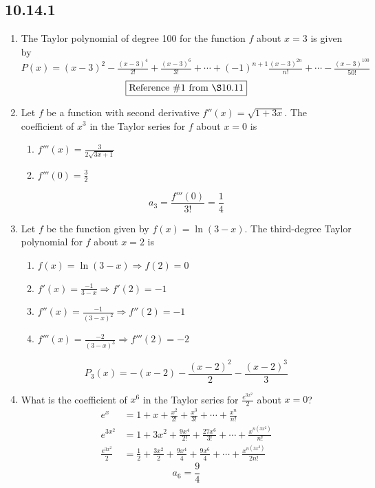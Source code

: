 \documentclass[12pt]{article}
\begin{document}
\subsection*{10.14.1}
\begin{enumerate}
	\item The Taylor polynomial of degree 100 for the function $f$ about $x = 3$ is given by $P(x) = (x-3)^2 - \frac{(x-3)^4}{2!} + \frac{(x-3)^6}{3!} + \cdots + (-1)^{n+1} \frac{(x-3)^{2n}}{n!}+ \cdots - \frac{(x-3)^{100}}{50!}$
	      $$\boxed{\text{Reference } \# 1 \text{ from } \S 10.11}$$
	\item Let $f$ be a function with second derivative $f''(x) = \sqrt{1+3x}$. The coefficient of $x^3$ in the Taylor series for $f$ about $x = 0$ is
	      \begin{enumerate}
	      	\item $f'''(x) = \frac{3}{2\sqrt{3x+1}}$
	      	\item $f'''(0) = \frac{3}{2}$
	      \end{enumerate}
	      $$a_3 = \frac{f'''(0)}{3!} = \boxed{\frac{1}{4}}$$
	\item Let $f$ be the function given by $f(x)=\ln(3-x)$. The third-degree Taylor polynomial for $f$ about $x=2$ is
	      \begin{enumerate}
	      	\item $f(x) = \ln(3-x) \Longrightarrow f(2) = 0$
	      	\item $f'(x) = \frac{-1}{3-x} \Longrightarrow f'(2) = -1$
	      	\item $f''(x) = \frac{-1}{(3-x)^2} \Longrightarrow f''(2) = -1$
	      	\item $f'''(x) = \frac{-2}{(3-x)^3} \Longrightarrow f'''(2) = -2$
	      \end{enumerate}
	      $$\boxed{P_{3}(x) = -(x-2)-\frac{(x-2)^2}{2}-\frac{(x-2)^3}{3}}$$
	      
	\item What is the coefficient of $x^6$ in the Taylor series for $\frac{e^{3x^2}}{2}$ about $x=0$?
	      \begin{align*}
	      	e^{x}              & = 1 + x + \frac{x^2}{2!} + \frac{x^3}{3!} + \cdots + \frac{x^n}{n!}                                 \\
	      	e^{3x^2}           & = 1 + 3x^2 + \frac{9x^4}{2!} + \frac{27x^6}{3!} + \cdots + \frac{x^{n(3x^2)}}{n!}                   \\
	      	\frac{e^{3x^2}}{2} & = \frac{1}{2} + \frac{3x^2}{2} + \frac{9x^4}{4} + \frac{9x^6}{4} + \cdots + \frac{x^{n(3x^2)}}{2n!} 
	      \end{align*}
	      $$\boxed{a_{6} = \frac{9}{4}}$$
	      

\end{enumerate}
\end{document}
